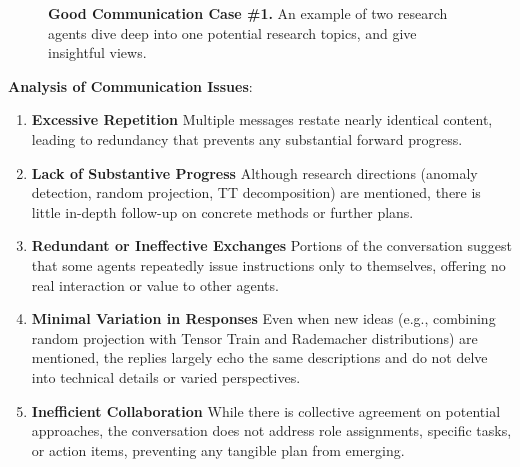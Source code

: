 \begin{figure}[htbp]
\begin{tcolorbox}[
    title=\textbf{Good Communication Case \#1},
    colback=red!1!white,
    colframe=red!50!black,
    fonttitle=\bfseries
]
\end{tcolorbox}
\caption{\textbf{Good Communication Case \#1.} An example of two research agents dive deep into one potential research topics, and give insightful views.}
\label{fig:bad_comm_case_1}
\end{figure}
\textbf{Analysis of Communication Issues}:

\begin{enumerate}
    \item \textbf{Excessive Repetition}  
    Multiple messages restate nearly identical content, leading to redundancy that prevents any substantial forward progress.

    \item \textbf{Lack of Substantive Progress}  
    Although research directions (anomaly detection, random projection, TT decomposition) are mentioned, there is little in-depth follow-up on concrete methods or further plans.

    \item \textbf{Redundant or Ineffective Exchanges}  
    Portions of the conversation suggest that some agents repeatedly issue instructions only to themselves, offering no real interaction or value to other agents.

    \item \textbf{Minimal Variation in Responses}  
    Even when new ideas (e.g., combining random projection with Tensor Train and Rademacher distributions) are mentioned, the replies largely echo the same descriptions and do not delve into technical details or varied perspectives.

    \item \textbf{Inefficient Collaboration}  
    While there is collective agreement on potential approaches, the conversation does not address role assignments, specific tasks, or action items, preventing any tangible plan from emerging.
\end{enumerate}



